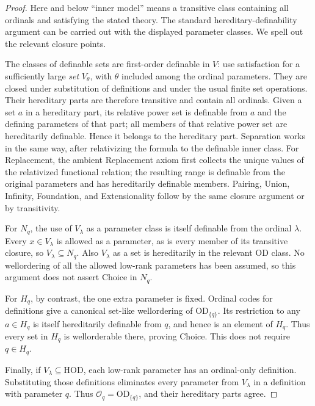 \documentclass[11pt,letterpaper]{article}
\theoremstyle{definition}
\numberwithin{equation}{section}
\newcommand{\HOD}{\mathrm{HOD}}
\newcommand{\OD}{\mathrm{OD}}
\begin{document}
\begin{proof}
Here and below ``inner model'' means a transitive class containing all ordinals and satisfying the stated theory. The standard hereditary-definability argument can be carried out with the displayed parameter classes. We spell out the relevant closure points.

The classes of definable sets are first-order definable in $V$: use satisfaction for a sufficiently large \emph{set} $V_\theta$, with $\theta$ included among the ordinal parameters. They are closed under substitution of definitions and under the usual finite set operations. Their hereditary parts are therefore transitive and contain all ordinals. Given a set $a$ in a hereditary part, its relative power set is definable from $a$ and the defining parameters of that part; all members of that relative power set are hereditarily definable. Hence it belongs to the hereditary part. Separation works in the same way, after relativizing the formula to the definable inner class. For Replacement, the ambient Replacement axiom first collects the unique values of the relativized functional relation; the resulting range is definable from the original parameters and has hereditarily definable members. Pairing, Union, Infinity, Foundation, and Extensionality follow by the same closure argument or by transitivity.

For $N_q$, the use of $V_\lambda$ as a parameter class is itself definable from the ordinal $\lambda$. Every $x\in V_\lambda$ is allowed as a parameter, as is every member of its transitive closure, so $V_\lambda\subseteq N_q$. Also $V_\lambda$ as a set is hereditarily in the relevant OD class. No wellordering of all the allowed low-rank parameters has been assumed, so this argument does not assert Choice in $N_q$.

For $H_q$, by contrast, the one extra parameter is fixed. Ordinal codes for definitions give a canonical set-like wellordering of $\OD_{\{q\}}$. Its restriction to any $a\in H_q$ is itself hereditarily definable from $q$, and hence is an element of $H_q$. Thus every set in $H_q$ is wellorderable there, proving Choice. This does not require $q\in H_q$.

Finally, if $V_\lambda\subseteq\HOD$, each low-rank parameter has an ordinal-only definition. Substituting those definitions eliminates every parameter from $V_\lambda$ in a definition with parameter $q$. Thus $\mathcal O_q=\OD_{\{q\}}$, and their hereditary parts agree.
\end{proof}
\end{document}
